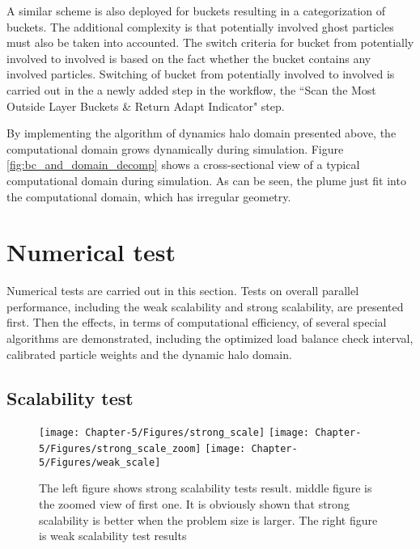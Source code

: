 A similar scheme is also deployed for buckets resulting in a categorization of buckets. The additional complexity is that potentially involved ghost particles must also be taken into accounted. The switch criteria for bucket from potentially involved to involved is based on the fact whether the bucket contains any involved particles. Switching of bucket from potentially involved to involved is carried out in the a newly added step in the workflow, the ``Scan the Most Outside Layer
Buckets \& Return Adapt Indicator" step.

By implementing the algorithm of dynamics halo domain presented above, the computational domain grows dynamically during simulation. Figure \ref{fig:bc_and_domain_decomp} shows a cross-sectional view of a typical computational domain during simulation. As can be seen, the plume just fit into the computational domain, which has irregular geometry.

\section{Numerical test} \label{sec:numerical-tests-computation}
Numerical tests are carried out in this section. Tests on overall parallel performance, including the weak scalability and strong scalability, are presented first. Then the effects, in terms of computational efficiency, of several special algorithms are demonstrated, including the optimized load balance check interval, calibrated particle weights and the dynamic halo domain.

\subsection{Scalability test}
\begin{figure*}[!t]
\centering
\texttt{[image: Chapter-5/Figures/strong\_scale]}
\hfil
\texttt{[image: Chapter-5/Figures/strong\_scale\_zoom]}
\hfil
\texttt{[image: Chapter-5/Figures/weak\_scale]}
\caption{The left figure shows strong scalability tests result. middle figure is the zoomed view of first one. It is obviously shown that strong scalability is better when the problem size is larger. The right figure is weak scalability test results}
\label{fig:2cases_efficiency}
\end{figure*}

